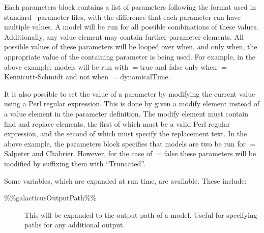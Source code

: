Each {\normalfont \ttfamily parameters} block contains a list of parameters following the format used in standard \glc\ parameter files, with the difference that each parameter can have multiple {\normalfont \ttfamily values}. A model will be run for all possible combinations of these values. Additionally, any {\normalfont \ttfamily value} element may contain further parameter elements. All possible values of these parameters will be looped over when, and only when, the appropriate value of the containing parameter is being used. For example, in the above example, models will be run with {\normalfont \ttfamily [starFormationKennicuttSchmidtTruncate]}$=${\normalfont \ttfamily true} and {\normalfont \ttfamily false} only when {\normalfont \ttfamily [starFormationTimescaleDisksMethod]}$=${\normalfont \ttfamily Kennicutt-Schmidt} and not when {\normalfont \ttfamily [starFormationTimescaleDisksMethod]}$=${\normalfont \ttfamily dynamicalTime}.

It is also possible to set the value of a parameter by modifying the current value using a Perl regular expression. This is done by given a {\normalfont \ttfamily modify} element instead of a {\normalfont \ttfamily value} element in the parameter definition. The {\normalfont \ttfamily modify} element must contain {\normalfont \ttfamily find} and {\normalfont \ttfamily replace} elements, the first of which must be a valid Perl regular expression, and the second of which must specify the replacement text. In the above example, the {\normalfont \ttfamily parameters} block specifies that models are two be run for {\normalfont \ttfamily [imfSelectionFixed]}$=${\normalfont \ttfamily Salpeter} and {\normalfont \ttfamily Chabrier}. However, for the case of {\normalfont \ttfamily [starFormationKennicuttSchmidtTruncate]}$=${\normalfont \ttfamily false} these parameters will be modified by suffixing them with ``{\normalfont \ttfamily Truncated}''.

Some variables, which are expanded at run time, are available. These include:
\begin{description}
\item [{\normalfont \ttfamily \%\%galacticusOutputPath\%\%}] This will be expanded to the output path of a model. Useful for specifying paths for any additional output.
\end{description}

